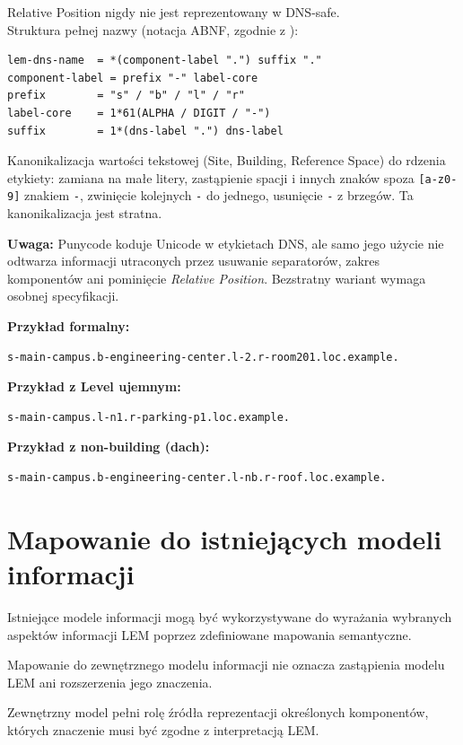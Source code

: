 \noindent Relative Position nigdy nie jest reprezentowany w DNS-safe.\\
Struktura pełnej nazwy (notacja ABNF, zgodnie z \cite{RFC5234}):
\begin{verbatim}
lem-dns-name  = *(component-label ".") suffix "."
component-label = prefix "-" label-core
prefix        = "s" / "b" / "l" / "r"
label-core    = 1*61(ALPHA / DIGIT / "-")
suffix        = 1*(dns-label ".") dns-label
\end{verbatim}

Kanonikalizacja wartości tekstowej (Site, Building, Reference Space) do rdzenia etykiety: zamiana na małe litery, zastąpienie spacji i innych znaków spoza \texttt{[a-z0-9]} znakiem \texttt{-}, zwinięcie kolejnych \texttt{-} do jednego, usunięcie \texttt{-} z brzegów. Ta kanonikalizacja jest stratna.

\noindent \textbf{Uwaga:} Punycode \cite{RFC3492} koduje Unicode w etykietach DNS, ale samo jego użycie nie odtwarza informacji utraconych przez usuwanie separatorów, zakres komponentów ani pominięcie \textit{Relative Position}. Bezstratny wariant wymaga osobnej specyfikacji.

\noindent \textbf{Przykład formalny:}
\begin{verbatim}
s-main-campus.b-engineering-center.l-2.r-room201.loc.example.
\end{verbatim}

\noindent \textbf{Przykład z Level ujemnym:}
\begin{verbatim}
s-main-campus.l-n1.r-parking-p1.loc.example.
\end{verbatim}

\noindent \textbf{Przykład z non-building (dach):}
\begin{verbatim}
s-main-campus.b-engineering-center.l-nb.r-roof.loc.example.
\end{verbatim}

\section{Mapowanie do istniejących modeli informacji}
\label{sec:mapowanie-modeli}
Istniejące modele informacji mogą być wykorzystywane do wyrażania wybranych aspektów informacji LEM poprzez zdefiniowane mapowania semantyczne.

Mapowanie do zewnętrznego modelu informacji nie oznacza zastąpienia modelu LEM ani rozszerzenia jego znaczenia.

Zewnętrzny model pełni rolę źródła reprezentacji określonych komponentów, których znaczenie musi być zgodne z interpretacją LEM.

